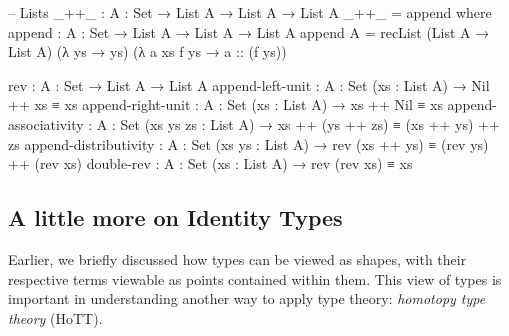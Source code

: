 \documentclass[12pt]{article}
\begin{document}
\begin{center}
\begin{minipage}{0.9\textwidth}
\begin{code}
-- Lists
_++_ : {A : Set} → List A → List A → List A
_++_ = append where
  append : {A : Set} → List A → List A → List A
  append {A} = recList (List A → List A)
                       (λ ys → ys)
                       (λ a xs f ys → a :: (f ys))

rev : {A : Set} → List A → List A
append-left-unit : {A : Set} (xs : List A) → Nil ++ xs ≡ xs
append-right-unit : {A : Set} (xs : List A) → xs ++ Nil ≡ xs
append-associativity : {A : Set} (xs ys zs : List A) →
                       xs ++ (ys ++ zs) ≡ (xs ++ ys) ++ zs
append-distributivity : {A : Set} (xs ys : List A) →
                        rev (xs ++ ys) ≡ (rev ys) ++ (rev xs) 
double-rev : {A : Set} (xs : List A) → rev (rev xs) ≡ xs
\end{code}
\end{minipage}
\end{center}

\subsection*{A little more on Identity Types}
Earlier, we briefly discussed how types can be viewed as shapes, with their
respective terms viewable as points contained within them. This view of types
is important in understanding another way to apply type theory:
{\em homotopy type theory} (HoTT).
\end{document}
